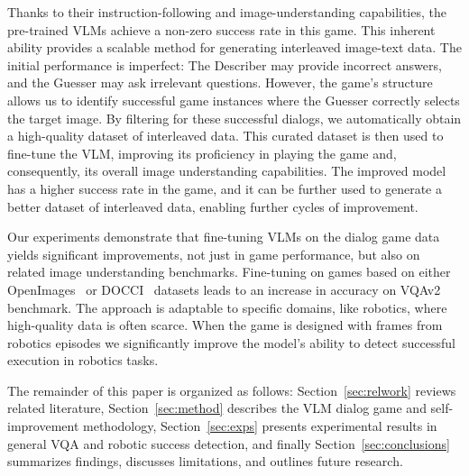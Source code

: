 Thanks to their instruction-following and image-understanding capabilities, the pre-trained VLMs achieve a non-zero success rate in this game.
This inherent ability provides a scalable method for generating interleaved image-text data.
The initial performance is imperfect:
The Describer may provide incorrect answers, and the Guesser may ask irrelevant questions.
However, the game's structure allows us to identify successful game instances where the Guesser correctly selects the target image.
By filtering for these successful dialogs, we automatically obtain a high-quality dataset of interleaved data.
This curated dataset is then used to fine-tune the VLM, improving its proficiency in playing the game and, consequently, its overall image understanding capabilities.
The improved model has a higher success rate in the game, and it can be further used to generate a better dataset of interleaved data, enabling further cycles of improvement.

Our experiments demonstrate that fine-tuning VLMs on the dialog game data yields significant improvements, not just in game performance, but also on related image understanding benchmarks.
Fine-tuning on games based on either OpenImages~\citep{kuznetsova2020openimages} or DOCCI~\citep{OnoeDocci2024} datasets leads to an increase in accuracy on VQAv2~\citep{goyal2017making} benchmark.
The approach is adaptable to specific domains, like robotics, where high-quality data is often scarce.
When the game is designed with frames from robotics episodes we significantly improve the model's ability to detect successful execution in robotics tasks.

The remainder of this paper is organized as follows: Section~\ref{sec:relwork} reviews related literature, Section~\ref{sec:method} describes the VLM dialog game and self-improvement methodology, Section~\ref{sec:exps} presents experimental results in general VQA and robotic success detection, and finally Section~\ref{sec:conclusions} summarizes findings, discusses limitations, and outlines future research.